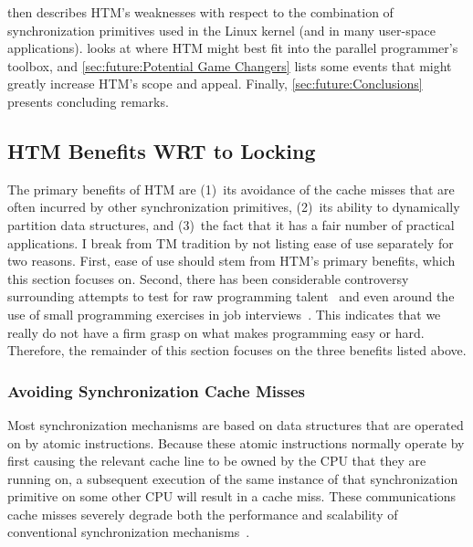  then describes
HTM's weaknesses with respect to the combination of synchronization
primitives used in the Linux kernel (and in many user-space applications).
 looks at where HTM
might best fit into the parallel programmer's toolbox, and
\cref{sec:future:Potential Game Changers} lists some events that might
greatly increase HTM's scope and appeal.
Finally, \cref{sec:future:Conclusions}
presents concluding remarks.

\subsection{HTM Benefits WRT to Locking}
\label{sec:future:HTM Benefits WRT to Locking}

The primary benefits of HTM are
(1)~its avoidance of the cache misses that are often incurred by
other synchronization primitives,
(2)~its ability to dynamically partition
data structures,
and (3)~the fact that it has
a fair number of practical applications.
I break from TM tradition by not listing ease of use separately
for two reasons.
First, ease of use should stem from HTM's primary benefits,
which this section focuses on.
Second, there has been considerable controversy surrounding attempts to
test for raw programming
talent~\cite{RichardBornat2006SheepGoats,SaeedDehnadi2009SheepGoats,ElizabethPatitsas2020GradesNotBimodal}
and even around the use of small programming exercises in job
interviews~\cite{RegBraithwaite2007FizzBuzz}.
This indicates that we really do not have a firm grasp on what makes
programming easy or hard.
Therefore, the remainder of this section focuses on the three benefits
listed above.

\subsubsection{Avoiding Synchronization Cache Misses}
\label{sec:future:Avoiding Synchronization Cache Misses}

Most synchronization mechanisms are based on data structures that are
operated on by atomic instructions.
Because these atomic instructions normally operate by first causing
the relevant cache line to be owned by the CPU that they are running on,
a subsequent execution
of the same instance of that synchronization primitive on some other
CPU will result in a cache miss.
These communications cache misses severely degrade both the performance and
scalability of conventional synchronization
mechanisms~\cite[Section 4.2.3]{Anderson97}.

